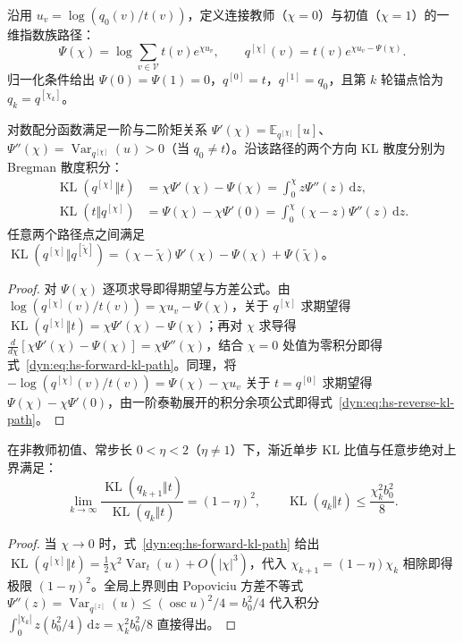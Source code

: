 \documentclass[lang=cn,scheme=chinese,openany]{elegantbook}
\newcommand{\E}{\mathbb E}
\newcommand{\KL}{\operatorname{KL}}
\newcommand{\Var}{\operatorname{Var}}
\begin{document}
沿用 $u_v=\log(q_0(v)/t(v))$，定义连接教师（$\chi=0$）与初值（$\chi=1$）的一维指数族路径：
\begin{equation*}
 \Psi(\chi)=\log\sum_{v\in\mathcal V}t(v)e^{\chi u_v},\qquad
 q^{[\chi]}(v)=t(v)e^{\chi u_v-\Psi(\chi)}.
\end{equation*}
归一化条件给出 $\Psi(0)=\Psi(1)=0$，$q^{[0]}=t$，$q^{[1]}=q_0$，且第 $k$ 轮锚点恰为 $q_k=q^{[\chi_k]}$。

\begin{theorem}
\label{dyn:thm:hs-kl-path}
对数配分函数满足一阶与二阶矩关系 $\Psi'(\chi)=\E_{q^{[\chi]}}[u]$、$\Psi''(\chi)=\Var_{q^{[\chi]}}(u)>0$（当 $q_0\ne t$）。沿该路径的两个方向 KL 散度分别为 Bregman 散度积分：
\begin{align}
 \KL(q^{[\chi]}\Vert t)
 &=\chi\Psi'(\chi)-\Psi(\chi)
 =\int_0^\chi z\Psi''(z)\,\mathrm dz,
 \label{dyn:eq:hs-forward-kl-path}\\
 \KL(t\Vert q^{[\chi]})
 &=\Psi(\chi)-\chi\Psi'(0)
 =\int_0^\chi(\chi-z)\Psi''(z)\,\mathrm dz.
 \label{dyn:eq:hs-reverse-kl-path}
\end{align}
任意两个路径点之间满足 $\KL(q^{[\chi]}\Vert q^{[\widetilde\chi]})=(\chi-\widetilde\chi)\Psi'(\chi)-\Psi(\chi)+\Psi(\widetilde\chi)$。
\end{theorem}
\begin{proof}
对 $\Psi(\chi)$ 逐项求导即得期望与方差公式。由 $\log(q^{[\chi]}(v)/t(v))=\chi u_v-\Psi(\chi)$，关于 $q^{[\chi]}$ 求期望得 $\KL(q^{[\chi]}\Vert t)=\chi\Psi'(\chi)-\Psi(\chi)$；再对 $\chi$ 求导得 $\frac{d}{d\chi}[\chi\Psi'(\chi)-\Psi(\chi)]=\chi\Psi''(\chi)$，结合 $\chi=0$ 处值为零积分即得式~\eqref{dyn:eq:hs-forward-kl-path}。同理，将 $-\log(q^{[\chi]}(v)/t(v))=\Psi(\chi)-\chi u_v$ 关于 $t=q^{[0]}$ 求期望得 $\Psi(\chi)-\chi\Psi'(0)$，由一阶泰勒展开的积分余项公式即得式~\eqref{dyn:eq:hs-reverse-kl-path}。
\end{proof}

\begin{corollary}
在非教师初值、常步长 $0<\eta<2$（$\eta\ne 1$）下，渐近单步 KL 比值与任意步绝对上界满足：
\begin{equation*}
 \lim_{k\to\infty}
 \frac{\KL(q_{k+1}\Vert t)}{\KL(q_k\Vert t)}
 =(1-\eta)^2,
 \qquad
 \KL(q_k\Vert t)\leq\frac{\chi_k^2 b_0^2}{8}.
\end{equation*}
\end{corollary}
\begin{proof}
当 $\chi\to 0$ 时，式~\eqref{dyn:eq:hs-forward-kl-path} 给出 $\KL(q^{[\chi]}\Vert t)=\frac12\chi^2\Var_t(u)+O(|\chi|^3)$，代入 $\chi_{k+1}=(1-\eta)\chi_k$ 相除即得极限 $(1-\eta)^2$。全局上界则由 Popoviciu 方差不等式 $\Psi''(z)=\Var_{q^{[z]}}(u)\le (\operatorname{osc}u)^2/4=b_0^2/4$ 代入积分 $\int_0^{|\chi_k|}z(b_0^2/4)\,\mathrm dz=\chi_k^2 b_0^2/8$ 直接得出。
\end{proof}
\end{document}
